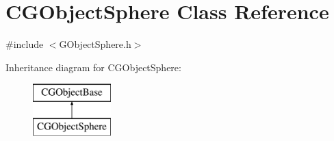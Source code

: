 \hypertarget{class_c_g_object_sphere}{}\section{C\+G\+Object\+Sphere Class Reference}
\label{class_c_g_object_sphere}


{\ttfamily \#include $<$G\+Object\+Sphere.\+h$>$}

Inheritance diagram for C\+G\+Object\+Sphere\+:\begin{figure}[H]
\begin{center}
\leavevmode
\includegraphics[height=2.000000cm]{class_c_g_object_sphere}
\end{center}
\end{figure}
